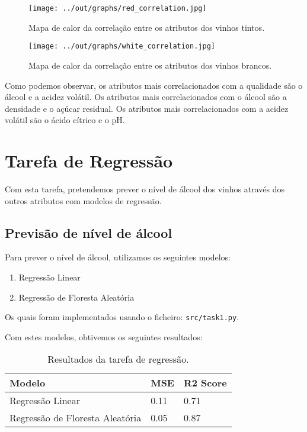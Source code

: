 \documentclass{article}
\begin{document}
    \begin{figure}
        \centering
        \begin{minipage}{0.45\textwidth}
            \centering
            \texttt{[image: ../out/graphs/red\_correlation.jpg]}
            \caption{Mapa de calor da correlação entre os atributos dos vinhos tintos.}
            \label{fig:corr_red}
        \end{minipage}
        \hfill
        \begin{minipage}{0.45\textwidth}
            \centering
            \texttt{[image: ../out/graphs/white\_correlation.jpg]}
            \caption{Mapa de calor da correlação entre os atributos dos vinhos brancos.}
            \label{fig:corr_white}
        \end{minipage}
    \end{figure}

    Como podemos observar, os atributos mais correlacionados com a qualidade são o álcool e a acidez volátil. Os atributos mais correlacionados com o álcool são a densidade e o açúcar residual. Os atributos mais correlacionados com a acidez volátil são o ácido cítrico e o pH.


    \section{Tarefa de Regressão}

    Com esta tarefa, pretendemos prever o nível de álcool dos vinhos através dos outros atributos com modelos de regressão.

    \subsection{Previsão de nível de álcool}
    Para prever o nível de álcool, utilizamos os seguintes modelos:

    \begin{enumerate}
        \item Regressão Linear
        \item Regressão de Floresta Aleatória
    \end{enumerate}

    Os quais foram implementados usando o ficheiro: \texttt{src/task1.py}.

    Com estes modelos, obtivemos os seguintes resultados:

    \begin{table}[ht]
        \centering
        \begin{tabular}{@{}lll@{}}
            \toprule
            Modelo                          & MSE  & R2 Score \\ \midrule
            Regressão Linear                & 0.11 & 0.71     \\
            Regressão de Floresta Aleatória & 0.05 & 0.87     \\ \bottomrule
        \end{tabular}
        \caption{Resultados da tarefa de regressão.}
        \label{tab:task1_results}
    \end{table}
\end{document}
